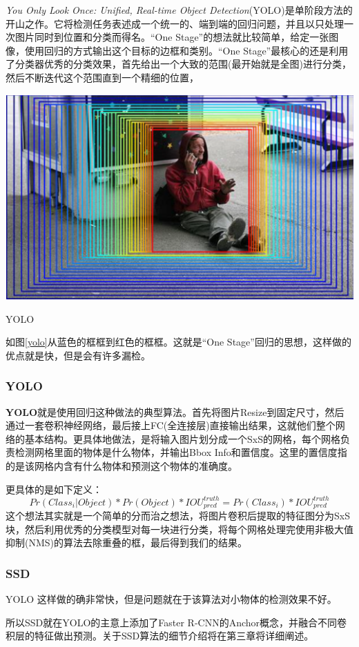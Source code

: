 \textit{You Only Look Once: Unified, Real-time Object Detection}(YOLO)\cite{yolo}是单阶段方法的开山之作。它将检测任务表述成一个统一的、端到端的回归问题，并且以只处理一次图片同时到位置和分类而得名。“One Stage”的想法就比较简单，给定一张图像，使用回归的方式输出这个目标的边框和类别。“One Stage”最核心的还是利用了分类器优秀的分类效果，首先给出一个大致的范围(最开始就是全图)进行分类，然后不断迭代这个范围直到一个精细的位置，
\begin{uscfigure}
	\includegraphics[width=\textwidth]{./Pictures/od_regressor.png}	
	\caption{YOLO}
	\label{yolo}
\end{uscfigure}
如图\ref{yolo}从蓝色的框框到红色的框框。这就是“One Stage”回归的思想，这样做的优点就是快，但是会有许多漏检。

\subsubsection{YOLO}
\textbf{YOLO}就是使用回归这种做法的典型算法。首先将图片Resize到固定尺寸，然后通过一套卷积神经网络，最后接上FC(全连接层)直接输出结果，这就他们整个网络的基本结构。更具体地做法，是将输入图片划分成一个SxS的网格，每个网格负责检测网格里面的物体是什么物体，并输出Bbox Info和置信度。这里的置信度指的是该网格内含有什么物体和预测这个物体的准确度。

更具体的是如下定义：
\[
	Pr(Class_i | Object) * Pr(Object) * IOU_{pred}^{truth} = Pr(Class_i) * IOU_{pred}^{truth}
\]
这个想法其实就是一个简单的分而治之想法，将图片卷积后提取的特征图分为SxS块，然后利用优秀的分类模型对每一块进行分类，将每个网格处理完使用非极大值抑制(NMS)的算法去除重叠的框，最后得到我们的结果。
\subsubsection{SSD}
YOLO 这样做的确非常快，但是问题就在于该算法对小物体的检测效果不好。

所以SSD就在YOLO的主意上添加了Faster R-CNN的Anchor概念，并融合不同卷积层的特征做出预测。关于SSD算法的细节介绍将在第三章将详细阐述。
